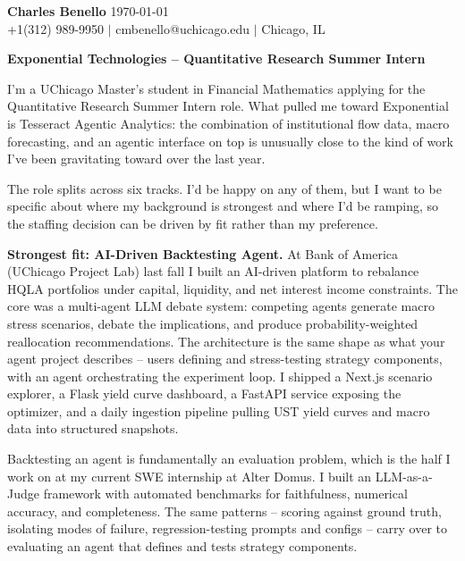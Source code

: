 \documentclass[letterpaper,11pt]{article}
\begin{document}
\noindent\textbf{\large Charles Benello} \hfill \today \\
\noindent +1(312) 989-9950 $|$ cmbenello@uchicago.edu $|$ Chicago, IL

\vspace{6pt}

\noindent\textbf{Exponential Technologies -- Quantitative Research Summer Intern}

\vspace{2pt}

I'm a UChicago Master's student in Financial Mathematics applying for the Quantitative Research Summer Intern role. What pulled me toward Exponential is Tesseract Agentic Analytics: the combination of institutional flow data, macro forecasting, and an agentic interface on top is unusually close to the kind of work I've been gravitating toward over the last year.

The role splits across six tracks. I'd be happy on any of them, but I want to be specific about where my background is strongest and where I'd be ramping, so the staffing decision can be driven by fit rather than my preference.

\textbf{Strongest fit: AI-Driven Backtesting Agent.} At Bank of America (UChicago Project Lab) last fall I built an AI-driven platform to rebalance HQLA portfolios under capital, liquidity, and net interest income constraints. The core was a multi-agent LLM debate system: competing agents generate macro stress scenarios, debate the implications, and produce probability-weighted reallocation recommendations. The architecture is the same shape as what your agent project describes -- users defining and stress-testing strategy components, with an agent orchestrating the experiment loop. I shipped a Next.js scenario explorer, a Flask yield curve dashboard, a FastAPI service exposing the optimizer, and a daily ingestion pipeline pulling UST yield curves and macro data into structured snapshots.

Backtesting an agent is fundamentally an evaluation problem, which is the half I work on at my current SWE internship at Alter Domus. I built an LLM-as-a-Judge framework with automated benchmarks for faithfulness, numerical accuracy, and completeness. The same patterns -- scoring against ground truth, isolating modes of failure, regression-testing prompts and configs -- carry over to evaluating an agent that defines and tests strategy components.
\end{document}
